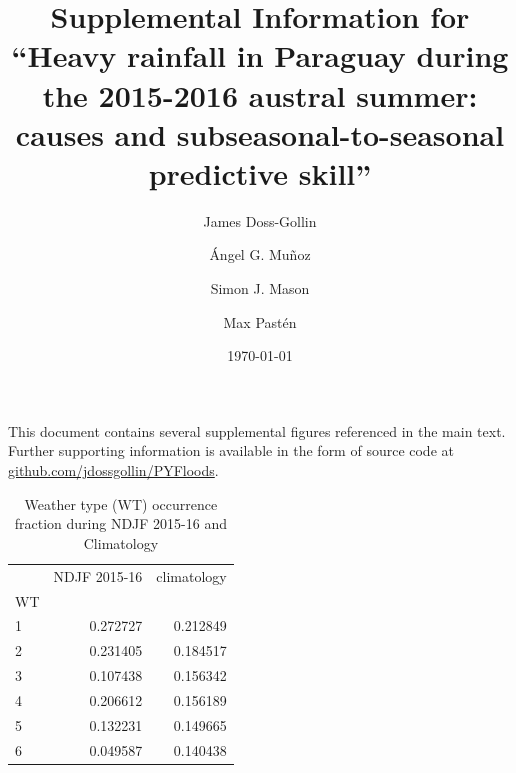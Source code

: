 \documentclass{article}
\title{Supplemental Information for\\``Heavy rainfall in Paraguay during the 2015-2016 austral summer: causes and subseasonal-to-seasonal predictive skill''}
\author{James Doss-Gollin\and \'{A}ngel G. Mu\~{n}oz  \and Simon J. Mason \and Max Past\'{e}n }
\date{\today}
\begin{document}
\maketitle

This document contains several supplemental figures referenced in the main text.
Further supporting information is available in the form of source code at \url{github.com/jdossgollin/PYFloods}.

\listoftables
\listoffigures

\clearpage

\begin{table}
	\centering
	\begin{tabular}{lrr}
		\toprule
		{} &  NDJF 2015-16 &  climatology \\
		WT &               &              \\
		\midrule
		1     &      0.272727 &     0.212849 \\
		2     &      0.231405 &     0.184517 \\
		3     &      0.107438 &     0.156342 \\
		4     &      0.206612 &     0.156189 \\
		5     &      0.132231 &     0.149665 \\
		6     &      0.049587 &     0.140438 \\
		\bottomrule
		\end{tabular}
	\caption{Weather type (WT) occurrence fraction during NDJF 2015-16 and Climatology}
\end{table}

\clearpage
\end{document}
